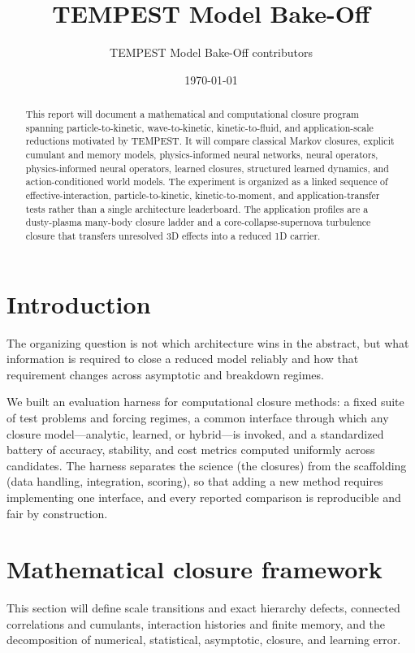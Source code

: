 \documentclass[11pt]{article}
\title{TEMPEST Model Bake-Off}
\author{TEMPEST Model Bake-Off contributors}
\date{\today}
\begin{document}
\maketitle

\begin{abstract}
This report will document a mathematical and computational closure program
spanning particle-to-kinetic, wave-to-kinetic, kinetic-to-fluid, and
application-scale reductions motivated by TEMPEST.  It will compare classical
Markov closures, explicit cumulant and memory models, physics-informed neural
networks, neural operators, physics-informed neural operators, learned
closures, structured learned dynamics, and action-conditioned world models.
The experiment is organized as a linked sequence of effective-interaction,
particle-to-kinetic, kinetic-to-moment, and application-transfer tests rather
than a single architecture leaderboard. The application profiles are a
dusty-plasma many-body closure ladder and a core-collapse-supernova turbulence
closure that transfers unresolved 3D effects into a reduced 1D carrier.
\end{abstract}

\setcounter{tocdepth}{1}
\tableofcontents

\section{Introduction}
The organizing question is not which architecture wins in the abstract, but
what information is required to close a reduced model reliably and how that
requirement changes across asymptotic and breakdown regimes.

We built an evaluation harness for computational closure methods: a fixed
suite of test problems and forcing regimes, a common interface through which
any closure model---analytic, learned, or hybrid---is invoked, and a
standardized battery of accuracy, stability, and cost metrics computed
uniformly across candidates. The harness separates the science (the closures)
from the scaffolding (data handling, integration, scoring), so that adding a
new method requires implementing one interface, and every reported comparison
is reproducible and fair by construction.

\section{Mathematical closure framework}
This section will define scale transitions and exact hierarchy defects,
connected correlations and cumulants, interaction histories and finite memory,
and the decomposition of numerical, statistical, asymptotic, closure, and
learning error.
\end{document}
